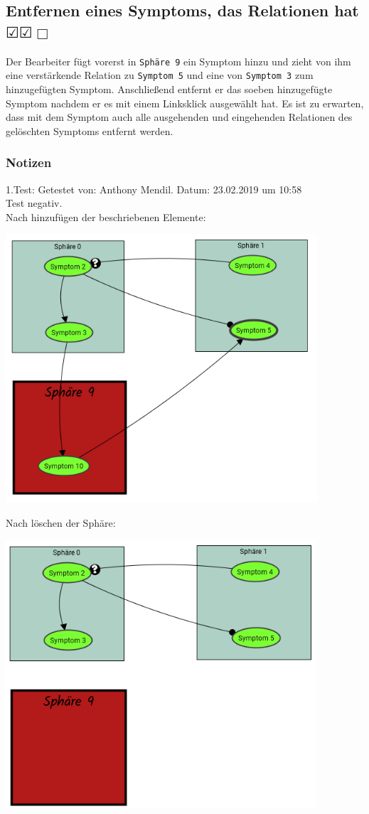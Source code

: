 \documentclass{scrartcl}
\newcommand{\subsectiont}[2]{\subsection[#1]{#1{\normalsize\normalfont #2}}}
\newcommand{\leer}{$\Box$}
\newcommand{\ok}{$\CheckedBox$}
\begin{document}
\subsectiont{Entfernen eines Symptoms, das Relationen hat}{\dotfill\ok\ok\leer}
Der Bearbeiter fügt vorerst in \texttt{Sphäre 9} ein Symptom hinzu und zieht von ihm eine verstärkende Relation zu \texttt{Symptom 5} und eine von \texttt{Symptom 3} zum hinzugefügten Symptom. Anschließend entfernt er das soeben hinzugefügte Symptom nachdem er es mit einem Linksklick ausgewählt hat. Es ist zu erwarten, dass mit dem Symptom auch alle ausgehenden und eingehenden Relationen des gelöschten Symptoms entfernt werden. 
\subsubsection{Notizen}
1.Test: Getestet von: Anthony Mendil. Datum: 23.02.2019 um 10:58 \\
Test negativ. \\
Nach hinzufügen der beschriebenen Elemente: 
\begin{center}
\includegraphics[height=10cm]{2_20korrektvorher.PNG}
\end{center}
Nach löschen der Sphäre: 
\begin{center}
\includegraphics[height=10cm]{2_20korrektnachher.PNG}
\end{center}
\end{document}
